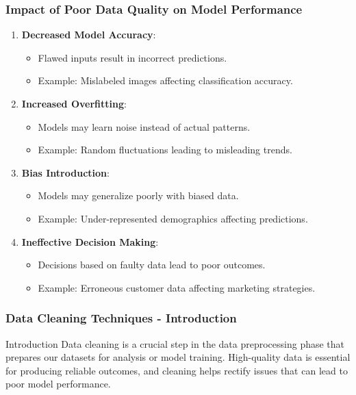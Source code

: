 \documentclass[aspectratio=169]{beamer}
\begin{document}
\begin{frame}[fragile]
    \frametitle{Impact of Poor Data Quality on Model Performance}
    \begin{enumerate}
        \item \textbf{Decreased Model Accuracy}:
            \begin{itemize}
                \item Flawed inputs result in incorrect predictions.
                \item Example: Mislabeled images affecting classification accuracy.
            \end{itemize}
        \item \textbf{Increased Overfitting}:
            \begin{itemize}
                \item Models may learn noise instead of actual patterns.
                \item Example: Random fluctuations leading to misleading trends.
            \end{itemize}
        \item \textbf{Bias Introduction}:
            \begin{itemize}
                \item Models may generalize poorly with biased data.
                \item Example: Under-represented demographics affecting predictions.
            \end{itemize}
        \item \textbf{Ineffective Decision Making}:
            \begin{itemize}
                \item Decisions based on faulty data lead to poor outcomes.
                \item Example: Erroneous customer data affecting marketing strategies.
            \end{itemize}
    \end{enumerate}
\end{frame}

\begin{frame}[fragile]
    \frametitle{Data Cleaning Techniques - Introduction}
    \begin{block}{Introduction}
        Data cleaning is a crucial step in the data preprocessing phase that prepares our datasets for analysis or model training. High-quality data is essential for producing reliable outcomes, and cleaning helps rectify issues that can lead to poor model performance.
    \end{block}
\end{frame}
\end{document}
